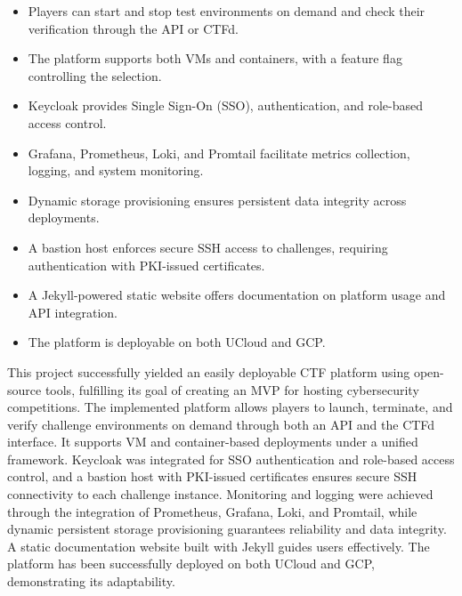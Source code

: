 \begin{itemize}
    \item Players can start and stop test environments on demand and check their verification through the API or CTFd.
    \item The platform supports both VMs and containers, with a feature flag controlling the selection.
    \item Keycloak provides Single Sign-On (SSO), authentication, and role-based access control.
    \item Grafana, Prometheus, Loki, and Promtail facilitate metrics collection, logging, and system monitoring.
    \item Dynamic storage provisioning ensures persistent data integrity across deployments.
    \item A bastion host enforces secure SSH access to challenges, requiring authentication with PKI-issued certificates.
    \item A Jekyll-powered static website offers documentation on platform usage and API integration.
    \item The platform is deployable on both UCloud and GCP.
\end{itemize}

This project successfully yielded an easily deployable CTF platform using open-source tools, fulfilling its goal of creating an MVP for hosting cybersecurity competitions. The implemented platform allows players to launch, terminate, and verify challenge environments on demand through both an API and the CTFd interface. It supports VM and container-based deployments under a unified framework. Keycloak was integrated for SSO authentication and role-based access control, and a bastion host with PKI-issued certificates ensures secure SSH connectivity to each challenge instance. Monitoring and logging were achieved through the integration of Prometheus, Grafana, Loki, and Promtail, while dynamic persistent storage provisioning guarantees reliability and data integrity. A static documentation website built with Jekyll guides users effectively. The platform has been successfully deployed on both UCloud and GCP, demonstrating its adaptability. 


